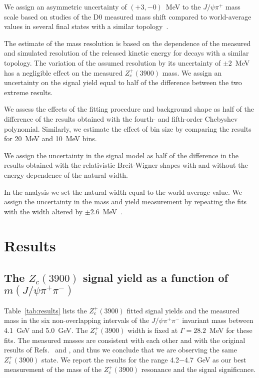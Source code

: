 \documentclass[aps,prd,twocolumn,superscriptaddress,groupedaddress,floatfix]{revtex4}
\begin{document}
  
We   assign an asymmetric uncertainty of $(+3,-0)$~MeV  to the $J/\psi \pi^+$ mass scale
based on studies of  the D0 measured mass shift  compared to world-average values
in several final states with a similar topology~\cite{incl}.

The estimate of the mass resolution  is based on
the dependence of the measured and simulated resolution of
the released kinetic energy  for decays with a similar topology.
The variation of the assumed resolution by its uncertainty of $\pm 2$~MeV
has a negligible effect on the measured  $Z_c^+(3900)$ mass.
We assign an uncertainty on  the  signal yield
equal to half of the difference between the two extreme results.

We assess the effects of the fitting procedure and background  shape
as half of the difference of the results obtained with the fourth- and fifth-order
Chebyshev polynomial. Similarly, we estimate  the effect of bin size by
comparing the results for 20~MeV and 10~MeV bins.

We assign the uncertainty in the signal model as  half of the difference
in the   results obtained with  the  relativistic   Breit-Wigner shapes
with  and without the energy dependence of the natural width.

In the analysis we set the natural width equal to the world-average value.
We assign the uncertainty in the mass and yield measurement
by repeating the fits with the width altered by $\pm 2.6$~MeV~\cite{pdg}.




\section{Results}


\subsection{The {\boldmath $Z_c(3900)$} signal yield as a function of  {\boldmath $m(J/\psi \pi^+ \pi^-)$}}


Table~\ref{tab:results} lists the  $Z_c^+(3900)$ fitted signal yields and the measured mass
in the six non-overlapping intervals of the $J/\psi \pi^+ \pi^-$ invariant mass between 4.1~GeV and
5.0~GeV. The $Z_c^+(3900)$ width is fixed at $\Gamma=28.2$~MeV for these fits.
The measured masses are consistent with each other and with the 
original results of Refs.~\cite{belle2013} and \cite{bes2013}, and thus
we conclude that we are observing the same $Z_c^+(3900)$ state. We report the results for the 
range 4.2$-$4.7~GeV  as our best measurement of the mass
 of the  $Z_c^+(3900)$ resonance and the signal significance.
\end{document}

